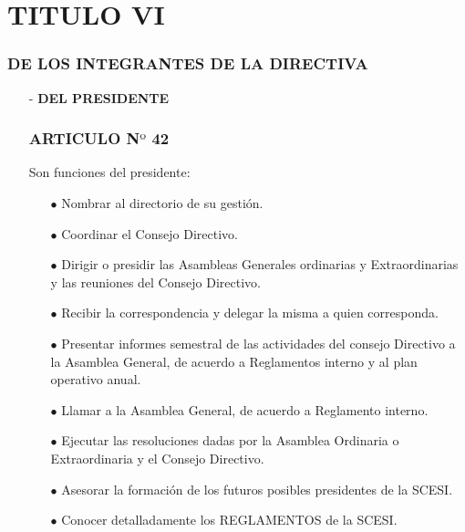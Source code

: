 \documentclass[letterpaper,11pt]{book}
\begin{document}
\section*{TITULO VI}
\subsubsection*{DE LOS INTEGRANTES DE LA DIRECTIVA}
\begin{itemize}
\item[-] {\bf DEL PRESIDENTE}
\subsubsection*{ARTICULO N$º$ 42}
Son funciones del presidente:
\begin{itemize}
\item[$\bullet$] Nombrar al directorio de su gestión.
\item[$\bullet$] Coordinar el Consejo Directivo.
\item[$\bullet$] Dirigir o presidir las Asambleas Generales ordinarias y Extraordinarias y las reuniones del Consejo Directivo. 
\item[$\bullet$] Recibir la correspondencia  y delegar la misma a quien corresponda.
\item[$\bullet$] Presentar informes semestral de las actividades del consejo Directivo a la Asamblea General, de acuerdo a Reglamentos interno y al plan operativo anual. 
\item[$\bullet$] Llamar a la Asamblea General, de acuerdo a Reglamento interno. 
\item[$\bullet$] Ejecutar las resoluciones dadas por la Asamblea Ordinaria o Extraordinaria y el Consejo Directivo. 
\item[$\bullet$] Asesorar la formación de los futuros posibles presidentes de la SCESI.
\item[$\bullet$] Conocer detalladamente los REGLAMENTOS de la SCESI.
\end{itemize}

\end{itemize}
\end{document}
